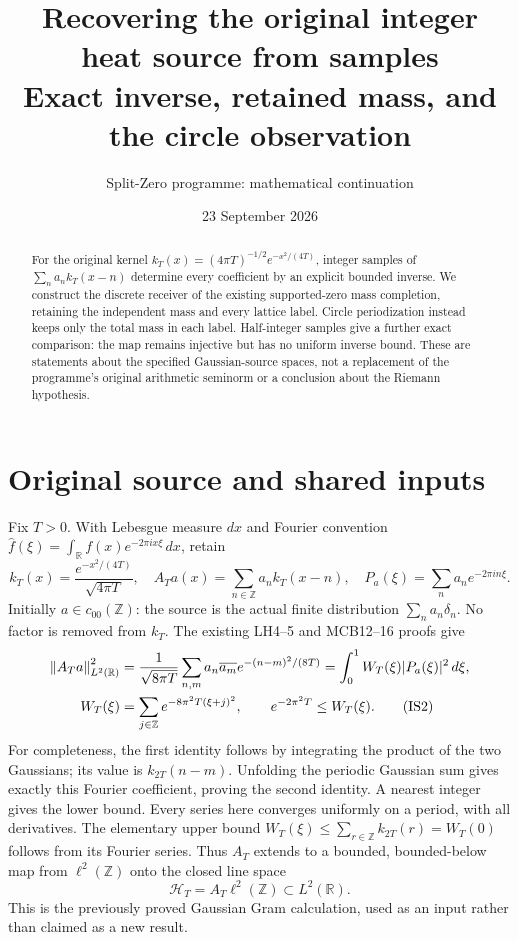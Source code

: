 \documentclass[11pt]{article}
\title{Recovering the original integer heat source from samples\\\large Exact inverse, retained mass, and the circle observation}
\author{Split-Zero programme: mathematical continuation}
\date{23 September 2026}
\newcommand{\Z}{\mathbb Z}\newcommand{\C}{\mathbb C}\newcommand{\R}{\mathbb R}
\newcommand{\norm}[1]{\left\|#1\right\|}
\begin{document}
\maketitle
\begin{abstract}
For the original kernel $k_T(x)=(4\pi T)^{-1/2}e^{-x^2/(4T)}$, integer samples of $\sum_n a_nk_T(x-n)$ determine every coefficient by an explicit bounded inverse. We construct the discrete receiver of the existing supported-zero mass completion, retaining the independent mass and every lattice label. Circle periodization instead keeps only the total mass in each label. Half-integer samples give a further exact comparison: the map remains injective but has no uniform inverse bound. These are statements about the specified Gaussian-source spaces, not a replacement of the programme's original arithmetic seminorm or a conclusion about the Riemann hypothesis.
\end{abstract}

\section{Original source and shared inputs}
Fix $T>0$. With Lebesgue measure $dx$ and Fourier convention
$\widehat f(\xi)=\int_{\R}f(x)e^{-2\pi ix\xi}\,dx$, retain
\begin{equation}
k_T(x)=\frac{e^{-x^2/(4T)}}{\sqrt{4\pi T}},\quad
A_Ta(x)=\sum_{n\in\Z}a_nk_T(x-n),\quad
P_a(\xi)=\sum_na_ne^{-2\pi in\xi}. \tag{IS1}
\end{equation}
Initially $a\in c_{00}(\Z)$: the source is the actual finite distribution $\sum_na_n\delta_n$. No factor is removed from $k_T$.
The existing LH4--5 and MCB12--16 proofs \cite{LH,MCB} give
\begin{align}
\norm{A_Ta}_{L^2(\R)}^2
 &=\frac1{\sqrt{8\pi T}}\sum_{n,m}a_n\overline{a_m}e^{-(n-m)^2/(8T)}
 =\int_0^1W_T(\xi)|P_a(\xi)|^2\,d\xi,\notag\\
W_T(\xi)&=\sum_{j\in\Z}e^{-8\pi^2T(\xi+j)^2},\qquad
 e^{-2\pi^2T}\le W_T(\xi). \tag{IS2}
\end{align}
For completeness, the first identity follows by integrating the product of the two Gaussians; its value is $k_{2T}(n-m)$. Unfolding the periodic Gaussian sum gives exactly this Fourier coefficient, proving the second identity. A nearest integer gives the lower bound. Every series here converges uniformly on a period, with all derivatives. The elementary upper bound $W_T(\xi)\le\sum_{r\in\Z}k_{2T}(r)=W_T(0)$ follows from its Fourier series. Thus $A_T$ extends to a bounded, bounded-below map from $\ell^2(\Z)$ onto the closed line space
\begin{equation}
\mathcal H_T=A_T\ell^2(\Z)\subset L^2(\R). \tag{IS3}
\end{equation}
This is the previously proved Gaussian Gram calculation, used as an input rather than claimed as a new result.
\end{document}
